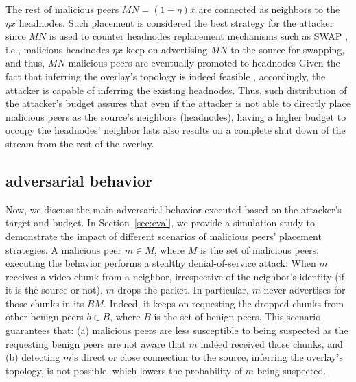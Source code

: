 The rest of malicious peers $MN=(1-\eta) x$ are connected as neighbors to the $\eta x$ headnodes. 
Such placement is considered the best strategy for the attacker since $MN$ is used to counter headnodes replacement mechanisms such as SWAP \cite{nguyen2016swap}, i.e., malicious headnodes $\eta x$ keep on advertising $MN$ to the source for swapping, and thus, $MN$ malicious peers are eventually promoted to headnodes
Given the fact that inferring the overlay's topology is indeed feasible \cite{nguyen2016swap,rbcs}, accordingly, the attacker is capable of inferring the existing headnodes.
Thus, such distribution of the attacker's budget assures that even if the attacker is not able to directly place malicious peers as the source's neighbors (headnodes), having a higher budget to occupy the headnodes' neighbor lists also results on a complete shut down of the stream from the rest of the overlay.



\subsection{\drop adversarial behavior}
Now, we discuss the main adversarial behavior executed based on the attacker's target and budget. 
In Section~\ref{sec:eval}, we provide a simulation study to demonstrate the impact of different scenarios of malicious peers' placement strategies. 
A malicious peer $m \in M$, where $M$ is the set of malicious peers, executing the \drop behavior performs a stealthy denial-of-service attack: 
When $m$ receives a video-chunk from a neighbor, irrespective of the neighbor's identity (if it is the source or not), $m$ drops the packet.
In particular, $m$ never advertises for those chunks in its $BM$.
Indeed, it keeps on requesting the dropped chunks from other benign peers $b \in B$, where $B$ is the set of benign peers.
This scenario guarantees that: (a) malicious peers are less susceptible to being suspected as the requesting benign peers are not aware that $m$ indeed received those chunks,
and (b) detecting $m$'s direct or close connection to the source, inferring the overlay's topology, is not possible, which lowers the probability of $m$ being suspected.

